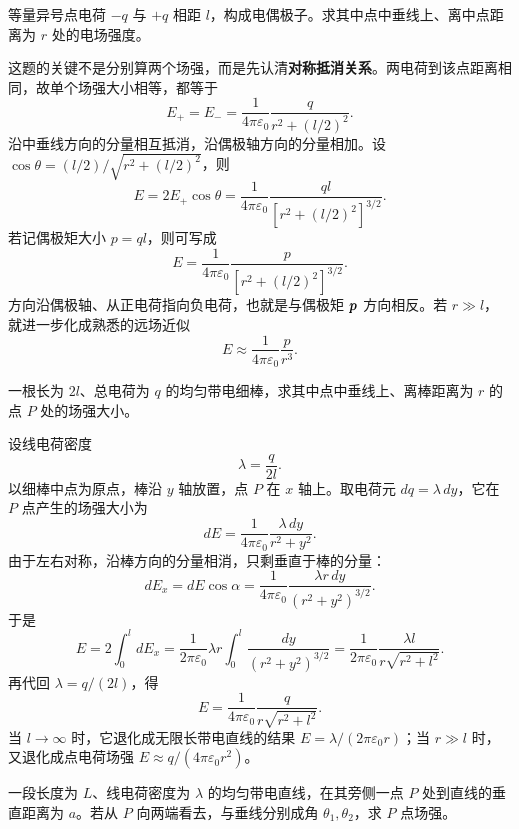 \documentclass[lang=cn,11pt]{elegantbook}
\begin{document}
\begin{example}[电偶极子中垂线上的场强]
等量异号点电荷 \(-q\) 与 \(+q\) 相距 \(l\)，构成电偶极子。求其中点中垂线上、离中点距离为 \(r\) 处的电场强度。
\end{example}

\begin{solution}
这题的关键不是分别算两个场强，而是先认清\textbf{对称抵消关系}。两电荷到该点距离相同，故单个场强大小相等，都等于
\[
E_+=E_-=\frac{1}{4\pi\varepsilon_0}\frac{q}{r^2+(l/2)^2}.
\]
沿中垂线方向的分量相互抵消，沿偶极轴方向的分量相加。设 \(\cos\theta=(l/2)/\sqrt{r^2+(l/2)^2}\)，则
\[
E=2E_+\cos\theta
=\frac{1}{4\pi\varepsilon_0}
\frac{ql}{\left[r^2+(l/2)^2\right]^{3/2}}.
\]
若记偶极矩大小 \(p=ql\)，则可写成
\[
E=\frac{1}{4\pi\varepsilon_0}
\frac{p}{\left[r^2+(l/2)^2\right]^{3/2}}.
\]
方向沿偶极轴、从正电荷指向负电荷，也就是与偶极矩 \(\vb*{p}\) 方向相反。若 \(r\gg l\)，就进一步化成熟悉的远场近似
\[
E\approx \frac{1}{4\pi\varepsilon_0}\frac{p}{r^3}.
\]
\end{solution}

\begin{example}[均匀带电细棒中垂线上的场强]
一根长为 \(2l\)、总电荷为 \(q\) 的均匀带电细棒，求其中点中垂线上、离棒距离为 \(r\) 的点 \(P\) 处的场强大小。
\end{example}

\begin{solution}
设线电荷密度
\[
\lambda=\frac{q}{2l}.
\]
以细棒中点为原点，棒沿 \(y\) 轴放置，点 \(P\) 在 \(x\) 轴上。取电荷元 \(dq=\lambda\,dy\)，它在 \(P\) 点产生的场强大小为
\[
dE=\frac{1}{4\pi\varepsilon_0}\frac{\lambda\,dy}{r^2+y^2}.
\]
由于左右对称，沿棒方向的分量相消，只剩垂直于棒的分量：
\[
dE_x=dE\cos\alpha
=\frac{1}{4\pi\varepsilon_0}\frac{\lambda r\,dy}{(r^2+y^2)^{3/2}}.
\]
于是
\[
E
=2\int_0^l dE_x
=\frac{1}{2\pi\varepsilon_0}\lambda r\int_0^l\frac{dy}{(r^2+y^2)^{3/2}}
=\frac{1}{2\pi\varepsilon_0}\frac{\lambda l}{r\sqrt{r^2+l^2}}.
\]
再代回 \(\lambda=q/(2l)\)，得
\[
\boxed{
E=\frac{1}{4\pi\varepsilon_0}\frac{q}{r\sqrt{r^2+l^2}}
}.
\]
当 \(l\to\infty\) 时，它退化成无限长带电直线的结果 \(E=\lambda/(2\pi\varepsilon_0 r)\)；当 \(r\gg l\) 时，又退化成点电荷场强 \(E\approx q/(4\pi\varepsilon_0 r^2)\)。
\end{solution}

\begin{example}[有限长均匀带电直线在旁侧一点的场强]
一段长度为 \(L\)、线电荷密度为 \(\lambda\) 的均匀带电直线，在其旁侧一点 \(P\) 处到直线的垂直距离为 \(a\)。若从 \(P\) 向两端看去，与垂线分别成角 \(\theta_1,\theta_2\)，求 \(P\) 点场强。
\end{example}
\end{document}
